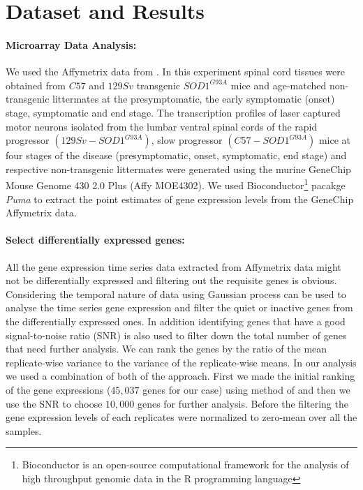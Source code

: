 \section{Dataset and Results}

\paragraph{Microarray Data Analysis:}
We used the Affymetrix data from \cite{Nardo:2013}.  In this experiment spinal cord tissues were obtained from $C57$ and $129Sv$ transgenic $SOD1^{G93A}$ mice and age-matched non-transgenic littermates at the presymptomatic, the early symptomatic (onset) stage, symptomatic and end stage.  The transcription profiles of laser captured motor neurons isolated from the lumbar ventral spinal cords of the rapid progressor $(129Sv-SOD1^{G93A})$, slow progressor $(C57-SOD1^{G93A})$ mice at four stages of the disease (presymptomatic, onset, symptomatic, end stage) and respective non-transgenic littermates were generated using the murine GeneChip Mouse Genome 430 2.0 Plus (Affy MOE4302). We used Bioconductor\footnote{Bioconductor is an open-source computational framework for the analysis of high throughput genomic data in the R programming language} pacakge \emph{Puma} \cite{puma} to extract the point estimates of gene expression levels from the GeneChip Affymetrix data.

\paragraph{Select differentially expressed genes:}
All the gene expression time series data extracted from Affymetrix data might not be differentially expressed and filtering out the requisite genes is obvious. Considering the temporal nature of data using Gaussian process \cite{Kalaitzis:2011} can be used to analyse the time series gene expression and filter the quiet or inactive genes from the differentially expressed ones.  In addition identifying genes that have a good signal-to-noise ratio (SNR) is also used to filter down the total number of genes that need further analysis. We can rank the genes by the ratio of the mean replicate-wise variance to the variance of the replicate-wise means. In our analysis we used a combination of both of the approach.  First we made the initial ranking of the gene expressions ($45,037$ genes for our case) using method of \cite{Kalaitzis:2011} and then we use the SNR to choose $10,000$ genes for further analysis.  Before the filtering the gene expression levels of each replicates were normalized to zero-mean over all the samples.

